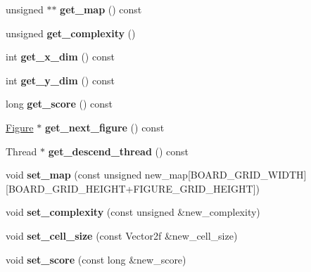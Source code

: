 \begin{DoxyCompactItemize}
unsigned $\ast$$\ast$ {\bfseries get\+\_\+map} () const
\item 
\mbox{\label{classBoard_a63fd87b1ed4840c43387ab42d5d61c95}} 
unsigned {\bfseries get\+\_\+complexity} ()
\item 
\mbox{\label{classBoard_ac03f309dec7d98cfabc0e8dbb9edf34b}} 
int {\bfseries get\+\_\+x\+\_\+dim} () const
\item 
\mbox{\label{classBoard_aaf2878f890c2d8739d813a4aa62a7c35}} 
int {\bfseries get\+\_\+y\+\_\+dim} () const
\item 
\mbox{\label{classBoard_a104d76e0bec0a8c83cb1b9541586ab1e}} 
long {\bfseries get\+\_\+score} () const
\item 
\mbox{\label{classBoard_a2952419a6699ff7a6f5ae1e8b96a1a11}} 
\hyperlink{classFigure}{Figure} $\ast$ {\bfseries get\+\_\+next\+\_\+figure} () const
\item 
\mbox{\label{classBoard_a33bdcd1e0ef6042a5f91ffe7f365c59a}} 
Thread $\ast$ {\bfseries get\+\_\+descend\+\_\+thread} () const
\item 
\mbox{\label{classBoard_ae30fe460017188c2a3203b70cebf02ba}} 
void {\bfseries set\+\_\+map} (const unsigned new\+\_\+map\mbox{[}B\+O\+A\+R\+D\+\_\+\+G\+R\+I\+D\+\_\+\+W\+I\+D\+TH\mbox{]}\mbox{[}B\+O\+A\+R\+D\+\_\+\+G\+R\+I\+D\+\_\+\+H\+E\+I\+G\+HT+F\+I\+G\+U\+R\+E\+\_\+\+G\+R\+I\+D\+\_\+\+H\+E\+I\+G\+HT\mbox{]})
\item 
\mbox{\label{classBoard_aec6f5ba3c7ae442864af4d27e210bcd1}} 
void {\bfseries set\+\_\+complexity} (const unsigned \&new\+\_\+complexity)
\item 
\mbox{\label{classBoard_a86d63abb1994e9d8ab53de3b3d4a7e3c}} 
void {\bfseries set\+\_\+cell\+\_\+size} (const Vector2f \&new\+\_\+cell\+\_\+size)
\item 
\mbox{\label{classBoard_ae4c28e2114f73527cd3ed24f1c5e8543}} 
void {\bfseries set\+\_\+score} (const long \&new\+\_\+score)
\item 
\mbox{\label{classBoard_addfe666815fc04a200ba129042b74182}} 
$$
\end{DoxyCompactItemize}
